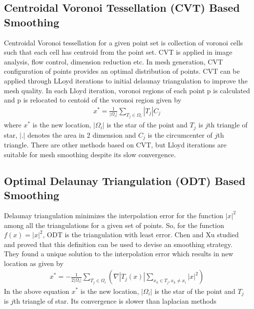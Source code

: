 \subsection{Centroidal Voronoi Tessellation (CVT) Based Smoothing}
Centroidal Voronoi tessellation for a given point set is collection of voronoi cells such that each cell has centroid from the point set. CVT is applied in image analysis, flow control, dimension reduction etc. In mesh generation, CVT configuration of points provides an optimal distribution of points. CVT can be applied through LLoyd iterations to initial delaunay triangulation to improve the mesh quality. In each Lloyd iteration, voronoi regions of each point p is calculated and p is relocated to centoid of the voronoi region given by 
\begin{eqnarray}
x^*= \frac{1}{|\Omega_i|} \sum_{T_j \in \Omega_i} |T_j|C_j
\end{eqnarray}
where  $x^*$ is the new location, $|\Omega_i|$ is the star of the point and $T_j$ is $j$th triangle of star, $|.|$ denotes the area in 2 dimension and $C_j$ is the circumcenter of $j$th triangle. There are other methods based on CVT, but Lloyd iterations are suitable for mesh smoothing despite its slow convergence.

\subsection{Optimal Delaunay Triangulation (ODT) Based Smoothing}
Delaunay triangulation minimizes the interpolation error for the function $|x|^2$ among all the triangulations for a given set of points. So, for the function $f(x) = |x|^2$, ODT is the triangulation with least error. Chen and Xu studied and proved that this definition can be used to devise an smoothing strategy. They found a unique solution to the interpolation error which results in new location as given by
\begin{eqnarray}
x^*=-\frac{1}{2|\Omega_i|} \sum_{T_j \in \Omega_i}(\nabla |T_j(x)| \sum_{x_k \in T_j, x_k \neq x_i} |x|^2)
\end{eqnarray}
In the above equation $x^*$ is the new location, $|\Omega_i|$ is the star of the point and $T_j$ is $j$th triangle of star. Its convergence is slower than laplacian methods 




